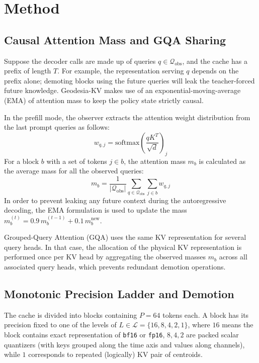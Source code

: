 \documentclass[10pt,twocolumn]{article}
\newcommand{\method}{Geodesia-KV}
\begin{document}
\section{Method}

\subsection{Causal Attention Mass and GQA Sharing}

Suppose the decoder calls are made up of queries $q \in \mathcal{Q}_{\text{obs}}$, and the cache has a prefix of length $T$. For example, the representation serving $q$ depends on the prefix alone; demoting blocks using the future queries will leak the teacher-forced future knowledge. \method{} makes use of an exponential-moving-average (EMA) of attention mass to keep the policy state strictly causal. 

In the prefill mode, the observer extracts the attention weight distribution from the last prompt queries as follows:
\begin{equation}
w_{q, j} = \mathrm{softmax}\left( \frac{q K^T}{\sqrt{d}} \right)_j
\end{equation}
For a block $b$ with a set of tokens $j \in b$, the attention mass $m_b$ is calculated as the average mass for all the observed queries:
\begin{equation}
m_b = \frac{1}{|\mathcal{Q}_{\text{obs}}|} \sum_{q \in \mathcal{Q}_{\text{obs}}} \sum_{j \in b} w_{q, j}
\end{equation}
In order to prevent leaking any future context during the autoregressive decoding, the EMA formulation is used to update the mass $m_b^{(t)} = 0.9 \, m_b^{(t-1)} + 0.1 \, m_b^{\text{new}}$.

Grouped-Query Attention (GQA) uses the same KV representation for several query heads. In that case, the allocation of the physical KV representation is performed once per KV head by aggregating the observed masses $m_b$ across all associated query heads, which prevents redundant demotion operations.
\subsection{Monotonic Precision Ladder and Demotion}
 
The cache is divided into blocks containing $P=64$ tokens each. A block has its precision fixed to one of the levels of $L \in \mathcal{L} = \{16, 8, 4, 2, 1\}$, where $16$ means the block contains exact representation of \texttt{bf16} or \texttt{fp16}, $8, 4, 2$ are packed scalar quantizers (with keys grouped along the time axis and values along channels), while $1$ corresponds to repeated (logically) KV pair of centroids.
\end{document}
